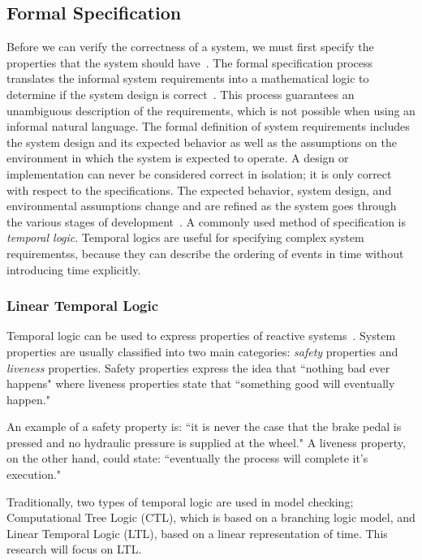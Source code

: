 


\subsection{Formal Specification}
\label{sec:formalSpec}
Before we can verify the correctness of a system, we must first specify the properties that the system should have~\cite{clarke2018model}. The formal specification process translates the informal system requirements into a mathematical logic to determine if the system design is correct~\cite{hinchey2012industrial}. This process guarantees an unambiguous description of the requirements, which is not possible when using an informal natural language. The formal definition of system requirements includes the system design and its expected behavior as well as the assumptions on the environment in which the system is expected to operate. A design or implementation can never be considered correct in isolation; it is only correct with respect to the specifications. The expected behavior, system design, and environmental assumptions change and are refined as the system goes through the various stages of development~\cite{lamsweerde2000formal}. A commonly used method of specification is \emph{temporal logic}. Temporal logics are useful for specifying complex system requirementss, because they can describe the ordering of events in time without introducing time explicitly. 

\subsubsection{Linear Temporal Logic}
Temporal logic can be used to express properties of reactive systems~\cite{Bozzano:2010:DSA:1951720}. System properties are usually classified into two main categories: {\em safety} properties and {\em liveness} properties. Safety properties express the idea that ``nothing bad ever happens" where liveness properties state that ``something good will eventually happen." 

An example of a safety property is: ``it is never the case that the brake pedal is pressed and no hydraulic pressure is supplied at the wheel." A liveness property, on the other hand, could state: ``eventually the process will complete it's execution." 

Traditionally, two types of temporal logic are used in model checking; Computational Tree Logic (CTL), which is based on a branching logic model, and Linear Temporal Logic (LTL), based on a linear representation of time. This research will focus on LTL. 

